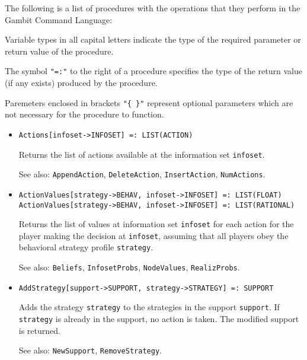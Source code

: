 The following is a list of procedures with the operations that they
perform in the Gambit Command Language:

Variable types in all capital letters indicate the type of the
required parameter or return value of the procedure.

The symbol {\tt "=:"} to the right of a procedure specifies the type
of the return value (if any exists) produced by the procedure.

Paremeters enclosed in brackets {\tt "\{ \}"} represent optional
parameters which are not necessary for the procedure to function.

\begin{itemize}


\item
\protect \large \begin{verbatim} 
Actions[infoset->INFOSET] =: LIST(ACTION)
\end{verbatim}\normalsize

\bd
Returns the list of actions available at the information set
\verb+infoset+.
\item
[See also:] {\tt AppendAction}, {\tt DeleteAction}, {\tt InsertAction},
{\tt NumActions}.
\ed

\item
\protect \large \begin{verbatim}
ActionValues[strategy->BEHAV, infoset->INFOSET] =: LIST(FLOAT)
ActionValues[strategy->BEHAV, infoset->INFOSET] =: LIST(RATIONAL)
\end{verbatim}\normalsize

\bd
Returns the list of values at information set \verb+infoset+ for each
action for the player making the decision at \verb+infoset+, assuming that
all players obey the behavioral strategy profile \verb+strategy+.
\item
[See also:] {\tt Beliefs}, {\tt InfosetProbs}, {\tt NodeValues},
{\tt RealizProbs}.
\ed

\item
\protect \large \begin{verbatim}
AddStrategy[support->SUPPORT, strategy->STRATEGY] =: SUPPORT
\end{verbatim}\normalsize

\bd
Adds the strategy \verb+strategy+ to the
strategies in the support \verb+support+.  If \verb+strategy+ is already in the
support, no action is taken.  The modified support is returned.
\item
[See also:] {\tt NewSupport}, {\tt RemoveStrategy}.
\ed


\end{itemize}
